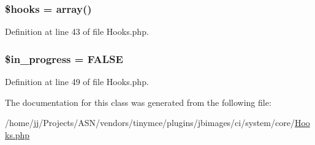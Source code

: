 \subsubsection[{\texorpdfstring{\$hooks}{$hooks}}]{\setlength{\rightskip}{0pt plus 5cm}\$hooks = array()}\hypertarget{class_c_i___hooks_a05aec88c3516c6db5da524fbcc673aff}{}\label{class_c_i___hooks_a05aec88c3516c6db5da524fbcc673aff}


Definition at line 43 of file Hooks.\+php.

\subsubsection[{\texorpdfstring{\$in\+\_\+progress}{$in_progress}}]{\setlength{\rightskip}{0pt plus 5cm}\$in\+\_\+progress = F\+A\+L\+SE}\hypertarget{class_c_i___hooks_a716cd4dd6525620af7e3f514582b1438}{}\label{class_c_i___hooks_a716cd4dd6525620af7e3f514582b1438}


Definition at line 49 of file Hooks.\+php.



The documentation for this class was generated from the following file\+:\begin{DoxyCompactItemize}
\item 
/home/jj/\+Projects/\+A\+S\+N/vendors/tinymce/plugins/jbimages/ci/system/core/\hyperlink{_hooks_8php}{Hooks.\+php}\end{DoxyCompactItemize}

